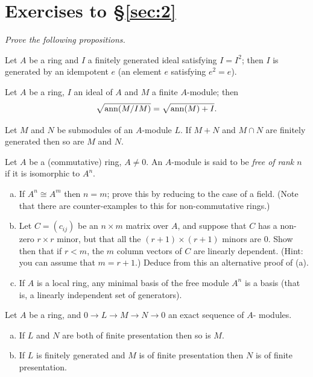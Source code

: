 \section*{Exercises to \S\ref{sec:2}}
\emph{Prove the following propositions.}

\begin{exercise}\label{ex:2.1-ex}
Let $A$ be a ring and $I$ a finitely generated ideal satisfying $I = I^2$; then $I$ is
generated by an idempotent $e$ (an element $e$ satisfying $e^2 = e$).
\end{exercise}

\begin{exercise}\label{ex:2.2-ex}
Let $A$ be a ring, $I$ an ideal of $A$ and $M$ a finite $A$-module; then
\[
  \sqrt{\operatorname{ann}(M/IM)} = \sqrt{\operatorname{ann}(M) + I}.
\]
\end{exercise}

\begin{exercise}\label{ex:2.3-ex}
Let $M$ and $N$ be submodules of an $A$-module $L$. If $M + N$ and $M \cap N$ are
finitely generated then so are $M$ and $N$.
\end{exercise}

\begin{exercise}\label{ex:2.4-ex}
Let $A$ be a (commutative) ring, $A \neq 0$. An $A$-module is said to be \emph{free of rank $n$}
if it is isomorphic to $A^n$.
\begin{enumerate}[(a)]
  \item If $A^n \cong A^m$ then $n = m$; prove this by reducing to the case of a field.
        (Note that there are counter-examples to this for non-commutative rings.)
  \item Let $C = (c_{ij})$ be an $n \times m$ matrix over $A$, and suppose that $C$ has a non-
        zero $r \times r$ minor, but that all the $(r + 1) \times (r + 1)$ minors are $0$. Show then
        that if $r < m$, the $m$ column vectors of $C$ are linearly dependent. (Hint: you
        can assume that $m = r + 1$.) Deduce from this an alternative proof of (a).
  \item If $A$ is a local ring, any minimal basis of the free module $A^n$ is a basis
        (that is, a linearly independent set of generators).
\end{enumerate}
\end{exercise}

\begin{exercise}\label{ex:2.5-ex}
Let $A$ be a ring, and $0 \to L \to M \to N \to 0$ an exact sequence of $A$-
modules.
\begin{enumerate}[(a)]
  \item If $L$ and $N$ are both of finite presentation then so is $M$.
  \item If $L$ is finitely generated and $M$ is of finite presentation then $N$ is of
        finite presentation.
\end{enumerate}
\end{exercise}
